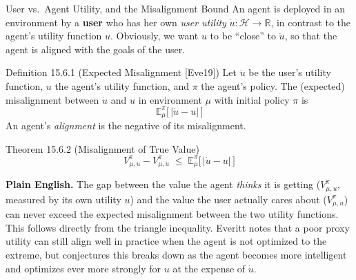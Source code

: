 \documentclass[aspectratio=169,10pt]{beamer}
\newcommand{\R}{\mathbb{R}}
\newcommand{\E}{\mathbb{E}}
\newcommand{\Hc}{\mathcal{H}}
\begin{document}
\begin{frame}{User vs.\ Agent Utility, and the Misalignment Bound}
  An agent is deployed in an environment by a \textbf{user} who has her
  own \emph{user utility} $\dot u:\Hc\to\R$, in contrast to the agent's
  utility function $u$. Obviously, we want $u$ to be ``close'' to $\dot
  u$, so that the agent is aligned with the goals of the user.

  \begin{block}{Definition 15.6.1 (Expected Misalignment [Eve19])}
    Let $\dot u$ be the user's utility function, $u$ the agent's utility
    function, and $\pi$ the agent's policy. The (expected) misalignment
    between $\dot u$ and $u$ in environment $\mu$ with initial policy
    $\pi$ is
    \[
      \E^\pi_\mu\big[\,|\dot u - u|\,\big]
    \]
    An agent's \emph{alignment} is the negative of its misalignment.
  \end{block}

  \begin{block}{Theorem 15.6.2 (Misalignment of True Value)}
    \[
      V^\pi_{\mu,u} - V^\pi_{\mu,\dot u} \;\le\; \E^\pi_\mu\big[\,|\dot u - u|\,\big]
    \]
  \end{block}
  \textbf{Plain English.} The gap between the value the agent \emph{thinks}
  it is getting ($V^\pi_{\mu,u}$, measured by its own utility $u$) and the
  value the user actually cares about ($V^\pi_{\mu,\dot u}$) can never
  exceed the expected misalignment between the two utility functions. This
  follows directly from the triangle inequality. Everitt notes that a poor
  proxy utility can still align well in practice when the agent is not
  optimized to the extreme, but conjectures this breaks down as the agent
  becomes more intelligent and optimizes ever more strongly for $u$ at the
  expense of $\dot u$.
\end{frame}
\end{document}
